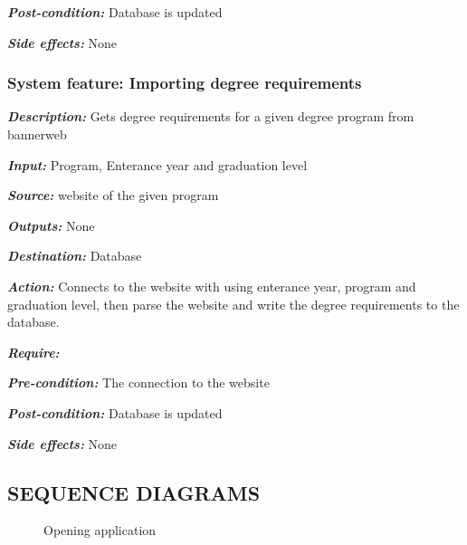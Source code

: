 \documentclass[twoside,letterpaper]{article}
\newcommand{\featuresection}[1] {
\subsubsection[System feature: #1]{\selectlanguage{english}\rmfamily\bfseries\color{black} System feature: #1}
}
\begin{document}
{\emph{\textbf{Post-condition: }} Database is updated

\emph{\textbf{Side effects:}} None



\featuresection{Importing degree requirements}

\emph{\textbf{Description:}} Gets degree requirements for a given degree program from bannerweb

\emph{\textbf{Input:}}  Program, Enterance year and graduation level

\emph{\textbf{Source:}} website of the given program

\emph{\textbf{Outputs:}} None

\emph{\textbf{Destination:}} Database

\emph{\textbf{Action:}} Connects to the website with using enterance year, program and graduation level, then parse the website and write the degree requirements to the database.  

\emph{\textbf{Require:}}

\emph{\textbf{Pre-condition: }} The connection to the website

\emph{\textbf{Post-condition: }} Database is updated

\emph{\textbf{Side effects:}} None

\clearpage
\subsection[SEQUENCE DIAGRAMS]{\rmfamily\bfseries\color{black}
SEQUENCE DIAGRAMS}

\begin{figure}[h!]
\centering
{}
\caption{Opening application}
\end{figure}

}
\end{document}
